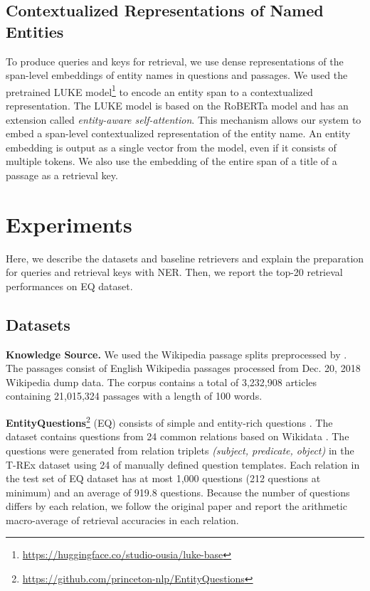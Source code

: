 \documentclass[letterpaper]{article} %
\begin{document}
\subsection{Contextualized Representations of Named Entities}\label{sec:contextualized_entity}
To produce queries and keys for retrieval, we use dense representations of the span-level embeddings of entity names in questions and passages.
We used the pretrained LUKE model\footnote{\url{https://huggingface.co/studio-ousia/luke-base}} to encode an entity span to a contextualized representation.
The LUKE model is based on the RoBERTa model \citep{roberta} and has an extension called \textit{entity-aware self-attention}.
This mechanism allows our system to embed a span-level contextualized representation of the entity name.
An entity embedding is output as a single vector from the model, even if it consists of multiple tokens.
We also use the embedding of the entire span of a title of a passage as a retrieval key.


\section{Experiments}\label{sec:experiments}
Here, we describe the datasets and baseline retrievers and explain the preparation for queries and retrieval keys with NER.
Then, we report the top-20 retrieval performances on EQ dataset.

\subsection{Datasets}\label{sec:datasets}
\textbf{Knowledge Source.}
We used the Wikipedia passage splits preprocessed by \citet{karpukhin-etal-2020-dense}.
The passages consist of English Wikipedia passages processed from Dec. 20, 2018 Wikipedia dump data.
The corpus contains a total of 3,232,908 articles containing 21,015,324 passages with a length of 100 words.

\textbf{EntityQuestions}\footnote{\url{https://github.com/princeton-nlp/EntityQuestions}} (EQ) consists of simple and entity-rich questions \citep{sciavolino-etal-2021-simple}.
The dataset contains questions from 24 common relations based on Wikidata \citep{vrandevcic2014wikidata}.
The questions were generated from relation triplets \textit{(subject, predicate, object)} in the T-REx dataset \citep{elsahar-etal-2018-rex} using 24 of manually defined question templates.
Each relation in the test set of EQ dataset has at most 1,000 questions (212 questions at minimum) and an average of 919.8 questions.
Because the number of questions differs by each relation, we follow the original paper and report the arithmetic macro-average of retrieval accuracies in each relation.
\end{document}

